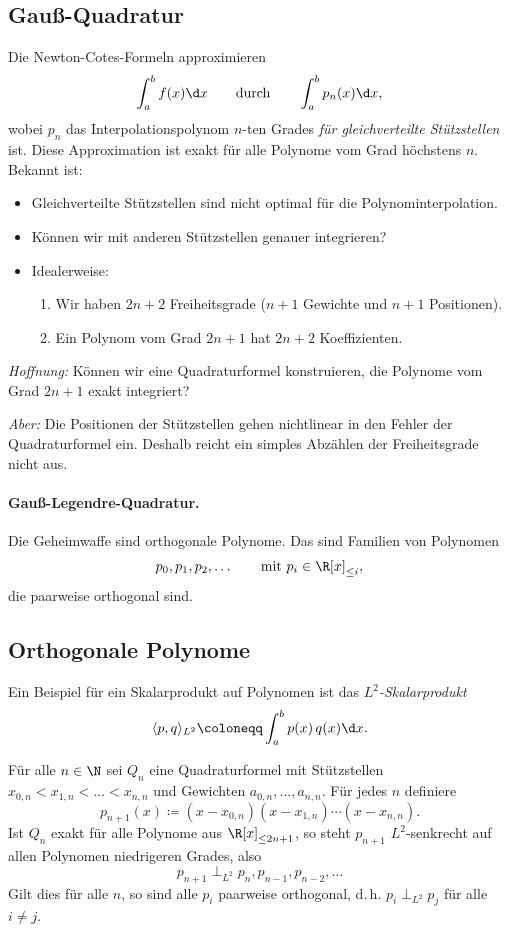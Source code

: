 \documentclass[11pt]{article}
\begin{document}
\subsection{Gauß-Quadratur}

Die Newton-Cotes-Formeln approximieren
\[ \int_a^b f(x) \d x \qquad \text{durch} \qquad \int_a^b p_n(x) \d x, \]
wobei $p_n$ das Interpolationspolynom $n$-ten Grades \textit{für gleichverteilte Stützstellen} ist. Diese Approximation ist exakt für alle Polynome vom Grad höchstens $n$. Bekannt ist:
\begin{itemize}
  \item Gleichverteilte Stützstellen sind nicht optimal für die Polynominterpolation.
  \item Können wir mit anderen Stützstellen genauer integrieren?
  \item Idealerweise:
    \begin{enumerate}[label=(\alph*)]
      \item Wir haben $2n + 2$ Freiheitsgrade ($n + 1$ Gewichte und $n + 1$ Positionen).
      \item Ein Polynom vom Grad $2n + 1$ hat $2n + 2$ Koeffizienten.
    \end{enumerate}
\end{itemize}
\textit{Hoffnung:} Können wir eine Quadraturformel konstruieren, die Polynome vom Grad $2n + 1$ exakt integriert?

\textit{Aber:} Die Positionen der Stützstellen gehen nichtlinear in den Fehler der Quadraturformel ein. Deshalb reicht ein simples Abzählen der Freiheitsgrade nicht aus.

\paragraph{Gauß-Legendre-Quadratur.}
Die \glqq Geheimwaffe\grqq{} sind orthogonale Polynome. Das sind Familien von Polynomen
\[ p_0, p_1, p_2, \dots \qquad \text{mit } p_i \in \R[x]_{\le i}, \]
die paarweise orthogonal sind.


\subsection{Orthogonale Polynome}

Ein Beispiel für ein Skalarprodukt auf Polynomen ist das \emph{$L^2$-Skalarprodukt}
\[ \langle p, q \rangle_{L^2} \coloneqq \int_a^b p(x)\, q(x) \d x. \]

\begin{lemma}[Stützstellenpolynome]\Theorem
  Für alle $n \in \N$ sei $Q_n$ eine Quadraturformel mit Stützstellen $x_{0,n} < x_{1,n} < \dots < x_{n,n}$ und Gewichten $a_{0,n}, \dots, a_{n,n}$. Für jedes $n$ definiere
  \[ p_{n+1}(x) \coloneqq (x - x_{0,n})(x - x_{1,n}) \dotsm (x - x_{n,n}). \]
  Ist $Q_n$ exakt für alle Polynome aus $\R[x]_{\le 2n+1}$, so steht $p_{n+1}$ $L^2$-senkrecht auf allen Polynomen niedrigeren Grades, also
  \[ p_{n+1} \perp_{L^2} p_n, p_{n-1}, p_{n-2}, \dots \]
  Gilt dies für alle $n$, so sind alle $p_i$ paarweise orthogonal, d.\,h. $p_i \perp_{L^2} p_j$ für alle $i \neq j$.
\end{lemma}
\end{document}
